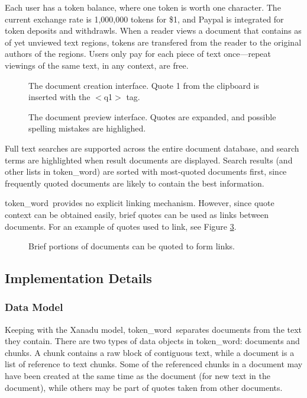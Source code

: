 \documentclass{acm_proc_article-sp}
\newcommand{\tw}{token\_word}
\begin{document}
Each user has a token balance, where one token is worth one character.
The current exchange rate is 1,000,000 tokens for \$1, and Paypal is integrated for token deposits and withdrawls.
When a reader views a document that contains as of yet unviewed text regions, tokens are transfered from the reader to the original authors of the regions.
Users only pay for each piece of text once---repeat viewings of the same text, in any context, are free.
\begin{figure}[t]
\centering
{}
\caption{The document creation interface. Quote 1 from the clipboard is inserted with the $<$q1$>$ tag.}
\label{fig:docCreate}
\end{figure}

\begin{figure}[t]
\centering
{}
\caption{The document preview interface.  Quotes are expanded, and possible spelling mistakes are highlighed.}
\label{fig:docPreview}
\end{figure}

Full text searches are supported across the entire document database, and search terms are highlighted when result documents are displayed.
Search results (and other lists in \tw) are sorted with most-quoted documents first, since frequently quoted documents are likely to contain the best information. 

\tw \  provides no explicit linking mechanism.
However, since quote context can be obtained easily, brief quotes can be used as links between documents.
For an example of quotes used to link, see Figure \ref{fig:quotesAsLinks}.

\begin{figure}[t]
\centering
{}
\caption{Brief portions of documents can be quoted to form links.}
\label{fig:quotesAsLinks}
\end{figure}

\subsection{Implementation Details}

\subsubsection{Data Model}
Keeping with the Xanadu model, \tw \  separates documents from the text they contain.
There are two types of data objects in \tw:  documents and chunks.
A chunk contains a raw block of contiguous text, while a document is a list of reference to text chunks.
Some of the referenced chunks in a document may have been created at the same time as the document (for new text in the document), while others may be part of quotes taken from other documents.
\end{document}
